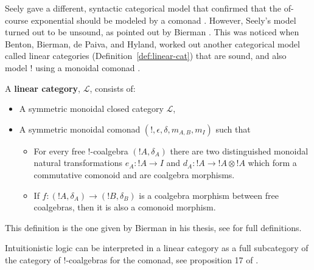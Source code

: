 \documentclass[preprint,6pt]{elsarticle}
\begin{document}
Seely gave a different, syntactic categorical model that confirmed
that the of-course exponential should be modeled by a comonad
\cite{Seely:1989}.  However, Seely's model turned out to be unsound,
as pointed out by Bierman \cite{Bierman:1994}.  This 
was noticed when
Benton, Bierman,  de Paiva, and Hyland,  
worked out another categorical
model called linear categories (Definition~\ref{def:linear-cat}) that
are sound, and also model $!$ using a monoidal comonad
\cite{Bierman:1994}.  
\begin{definition}
  \label{def:linear-cat}
  A \textbf{linear category}, $\mathcal{L}$, consists of:
  \begin{center}
    \begin{itemize}
    \item A symmetric monoidal closed category $\mathcal{L}$,
    \item A symmetric monoidal comonad $(!, \epsilon, \delta, m_{A,B},
      m_I)$ such that 
      \begin{itemize}
      \item For every free $!$-coalgebra $(!A,\delta_A)$ there are two
        distinguished monoidal natural transformations $e_A : !A \to
        I$ and $d_A : !A \to !A \otimes !A$ which form a commutative
        comonoid and are coalgebra morphisms.
      \item If $f : (!A,\delta_A) \to (!B,\delta_B)$ is a coalgebra
        morphism between free coalgebras, then it is also a comonoid
        morphism.
      \end{itemize}
    \end{itemize}
  \end{center}
  This definition is the one given by Bierman in his thesis, see
  \cite{Bierman:1994} for full definitions.
\end{definition}
\noindent
Intuitionistic logic can be interpreted in a linear category as a
full subcategory of the category of $!$-coalgebras for the comonad,
see proposition 17 of \cite{Bierman:1994}.
\end{document}
